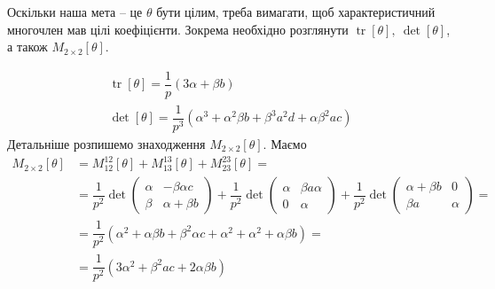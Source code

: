 \documentclass{thesis}
\DeclareMathOperator{\tr}{tr}
\begin{document}
Оскільки наша мета -- це $\theta$ бути цілим, треба вимагати, щоб характеристичний многочлен мав цілі коефіцієнти. Зокрема необхідно розглянути $\tr [\theta],\ \det [\theta]$, а також $M_{2 \times 2}[\theta]$.

\begin{align*}
\tr [\theta] = \dfrac{1}{p} (3 \alpha + \beta b) \\
\det [\theta] = \dfrac{1}{p^3} \left( \alpha^3 + \alpha^2 \beta b + \beta^3 a^2 d + \alpha \beta^2 ac \right)
\end{align*}
Детальніше розпишемо знаходження $M_{2 \times 2}[\theta]$. Маємо
\begin{align*}
M_{2 \times 2}[\theta] & = M_{12}^{12}[\theta] + M_{13}^{13}[\theta] + M_{23}^{23}[\theta] = \\
& = \dfrac{1}{p^2} \det \begin{pmatrix}
\alpha & -\beta \alpha c \\
\beta & \alpha + \beta b
\end{pmatrix} + \dfrac{1}{p^2} \det \begin{pmatrix}
\alpha & \beta a \alpha \\
0 & \alpha
\end{pmatrix} + \dfrac{1}{p^2} \det \begin{pmatrix}
\alpha + \beta b & 0 \\
\beta a & \alpha
\end{pmatrix} = \\
& = \dfrac{1}{p^2} \left( \alpha^2 + \alpha \beta b + \beta^2 \alpha c + \alpha^2 + \alpha^2 + \alpha \beta b \right) = \\ 
& = \dfrac{1}{p^2} \left( 3 \alpha^2 + \beta^2 a c + 2 \alpha \beta b\right)
\end{align*}
\end{document}
